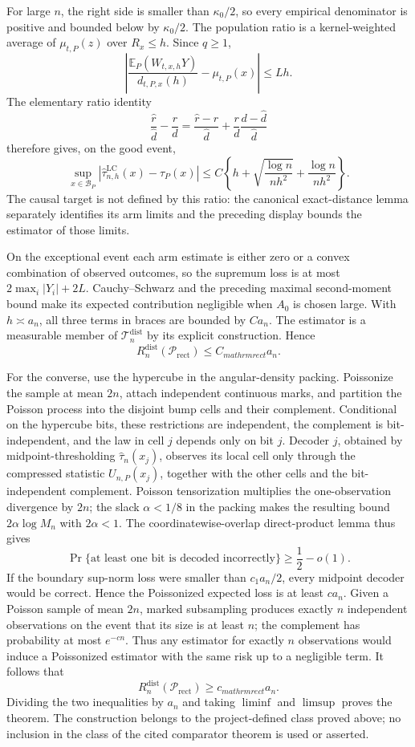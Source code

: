 For large \(n\), the right side is smaller than \(\kappa_0/2\), so every empirical denominator is positive and bounded below by \(\kappa_0/2\).  The population ratio is a kernel-weighted average of \(\mu_{t,P}(z)\) over \(R_x\leq h\).  Since \(q\geq1\),
\[
 \left|\frac{\mathbb E_P(W_{t,x,h}Y)}{d_{t,P,x}(h)}-\mu_{t,P}(x)\right|
 \leq Lh.
\]
The elementary ratio identity
\[
 \frac{\widehat r}{\widehat d}-\frac r d
 =\frac{\widehat r-r}{\widehat d}
 +\frac r d\frac{d-\widehat d}{\widehat d}
\]
therefore gives, on the good event,
\[
 \sup_{x\in\mathcal B_P}
 |\widehat\tau^{\mathrm{LC}}_{n,h}(x)-\tau_P(x)|
 \leq C\left\{h+\sqrt{\frac{\log n}{nh^2}}+\frac{\log n}{nh^2}\right\}.
\]
The causal target is not defined by this ratio: the canonical exact-distance lemma separately identifies its arm limits and the preceding display bounds the estimator of those limits.

On the exceptional event each arm estimate is either zero or a convex combination of observed outcomes, so the supremum loss is at most \(2\max_i|Y_i|+2L\).  Cauchy--Schwarz and the preceding maximal second-moment bound make its expected contribution negligible when \(A_0\) is chosen large.  With \(h\asymp a_n\), all three terms in braces are bounded by \(Ca_n\).  The estimator is a measurable member of \(\mathcal T_n^{\mathrm{dist}}\) by its explicit construction.  Hence
\[
 R_n^{\mathrm{dist}}(\mathcal P_{\mathrm{rect}})\leq C_{mathrm{rect}}a_n.
\]

For the converse, use the hypercube in the angular-density packing.  Poissonize the sample at mean \(2n\), attach independent continuous marks, and partition the Poisson process into the disjoint bump cells and their complement.  Conditional on the hypercube bits, these restrictions are independent, the complement is bit-independent, and the law in cell \(j\) depends only on bit \(j\).  Decoder \(j\), obtained by midpoint-thresholding \(\widehat\tau_n(x_j)\), observes its local cell only through the compressed statistic \(U_{n,P}(x_j)\), together with the other cells and the bit-independent complement.  Poisson tensorization multiplies the one-observation divergence by \(2n\); the slack \(\alpha<1/8\) in the packing makes the resulting bound \(2\alpha\log M_n\) with \(2\alpha<1\).  The coordinatewise-overlap direct-product lemma thus gives
\[
 \Pr\{\text{at least one bit is decoded incorrectly}\}\geq\frac12-o(1).
\]
If the boundary sup-norm loss were smaller than \(c_1a_n/2\), every midpoint decoder would be correct.  Hence the Poissonized expected loss is at least \(c a_n\).  Given a Poisson sample of mean \(2n\), marked subsampling produces exactly \(n\) independent observations on the event that its size is at least \(n\); the complement has probability at most \(e^{-cn}\).  Thus any estimator for exactly \(n\) observations would induce a Poissonized estimator with the same risk up to a negligible term.  It follows that
\[
 R_n^{\mathrm{dist}}(\mathcal P_{\mathrm{rect}})\geq c_{mathrm{rect}}a_n.
\]
Dividing the two inequalities by \(a_n\) and taking \(\liminf\) and \(\limsup\) proves the theorem.  The construction belongs to the project-defined class proved above; no inclusion in the class of the cited comparator theorem is used or asserted.